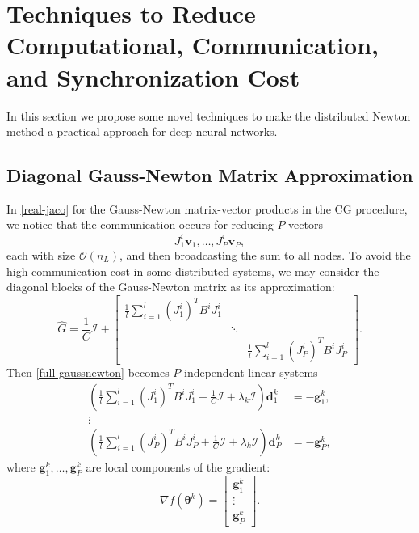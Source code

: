 \documentclass[12pt]{article}
\def\bv{{\boldsymbol v}}
\def\bd{{\boldsymbol d}}
\def\bg{{\boldsymbol g}}
\def\btheta{\boldsymbol \theta}
\begin{document}
\section{Techniques to Reduce Computational, Communication, and Synchronization Cost}
\label{sec:Reduce-compu-communi}
In this section we propose some novel techniques to make the distributed Newton method a practical approach for deep neural networks.
\subsection{Diagonal Gauss-Newton Matrix Approximation}
\label{subsec:diagonalize}
\par In \eqref{real-jaco} for the Gauss-Newton matrix-vector products in the CG procedure, we notice that the communication occurs for reducing $P$ vectors
\begin{equation*}
    J^i_1 \bv_1,\ldots,J^i_P \bv_P,
\end{equation*}
each with size $\mathcal{O}(n_L)$, and then broadcasting the sum to all nodes. To avoid the high communication cost in some distributed systems, 
we may consider the diagonal blocks of the Gauss-Newton matrix as its approximation:
\begin{equation}
\label{gausshat}
\hat{G} = \frac{1}{C} \mathcal I + 
\begin{bmatrix}
    \frac{1}{l}\sum_{i=1}^l (J^i_1)^T B^i J^i_1 & & \\
        & \ddots & \\
     & & \frac{1}{l} \sum_{i=1}^l (J^i_P)^T B^i J^i_P
\end{bmatrix}.
\end{equation}
Then \eqref{full-gaussnewton} becomes $P$ independent linear systems
\begin{align}
    (\frac{1}{l}\sum_{i=1}^l (J^i_1)^T B^i J^i_1+\frac{1}{C} \mathcal I + \lambda_k \mathcal I)\bd^k_1 &= -\bg^k_1,\nonumber\\
    \vdots \label{p-linear}\\
    (\frac{1}{l}\sum_{i=1}^l (J^i_P)^T B^i J^i_P+\frac{1}{C} \mathcal I + \lambda_k \mathcal I)\bd^k_P &= -\bg^k_P,\nonumber
\end{align}
where $\bg_1^k, \ldots, \bg_P^k$ are local components of the gradient:
\begin{equation*}
\nabla f(\btheta^k) =
\begin{bmatrix}
\bg_1^k \\ \vdots \\ \bg_P^k
\end{bmatrix}.
\end{equation*}
\end{document}
